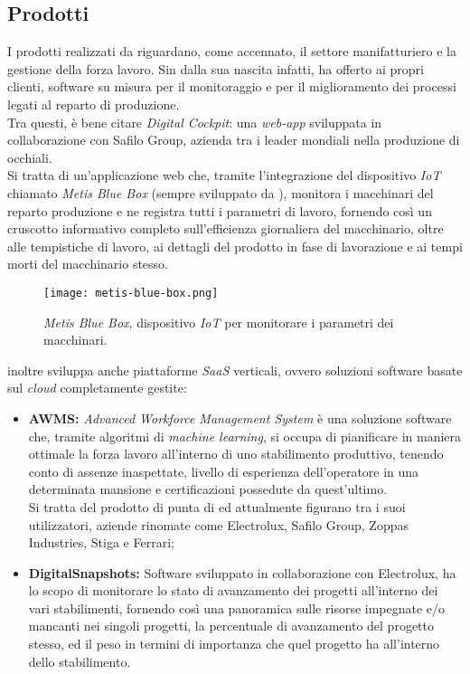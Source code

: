 \subsection{Prodotti}
I prodotti realizzati da \AD{} riguardano, come accennato, il settore manifatturiero e la gestione della forza lavoro.
Sin dalla sua nascita infatti, \AD{} ha offerto ai propri clienti, software su misura per il monitoraggio e per il miglioramento dei processi legati al reparto di produzione.\\
Tra questi, è bene citare \textit{Digital Cockpit}: una \textit{web-app} sviluppata in collaborazione con Safilo Group, azienda tra i leader mondiali nella produzione di occhiali.\\
Si tratta di un'applicazione web che, tramite l'integrazione del dispositivo \textit{IoT} chiamato \textit{Metis Blue Box} (sempre sviluppato da \AD ), monitora i macchinari del reparto produzione e ne registra tutti i parametri di lavoro, fornendo così un cruscotto informativo completo sull'efficienza giornaliera del macchinario, oltre alle tempistiche di lavoro, ai dettagli del prodotto in fase di lavorazione e ai tempi morti del macchinario stesso.\\
\begin{figure}[h]
\texttt{[image: metis-blue-box.png]}
\centering
\caption{\textit{Metis Blue Box}, dispositivo \textit{IoT} per monitorare i parametri dei macchinari.}
\label{fig:metis-blue-box}
\end{figure}

\AD{} inoltre sviluppa anche piattaforme \textit{SaaS} verticali, ovvero soluzioni software basate sul \textit{cloud} completamente gestite:
\begin{itemize}
\item \textbf{AWMS:} \textit{Advanced Workforce Management System} è una soluzione software che, tramite algoritmi di \textit{machine learning}, si occupa di pianificare in maniera ottimale la forza lavoro all'interno di uno stabilimento produttivo, tenendo conto di assenze inaspettate, livello di esperienza dell'operatore in una determinata mansione e certificazioni possedute da quest'ultimo. \\
Si tratta del prodotto di punta di \AD{} ed attualmente figurano tra i suoi utilizzatori, aziende rinomate come Electrolux, Safilo Group, Zoppas Industries, Stiga e Ferrari;
\item \textbf{DigitalSnapshots:} Software sviluppato in collaborazione con Electrolux, ha lo scopo di monitorare lo stato di avanzamento dei progetti all'interno dei vari stabilimenti, fornendo così una panoramica sulle risorse impegnate e/o mancanti nei singoli progetti, la percentuale di avanzamento del progetto stesso, ed il peso in termini di importanza che quel progetto ha all'interno dello stabilimento.
\end{itemize}

